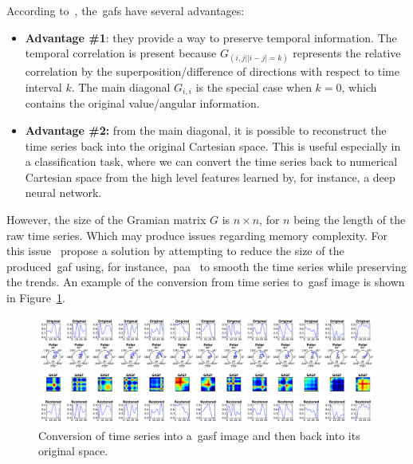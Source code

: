 According to~\cite{wang_imaging_2015}, the~\gls{gaf}s have several advantages:

\begin{itemize}[leftmargin=*,labelsep=5.8mm]
\item \textbf{{Advantage \#1}}: they provide a way to preserve temporal information. The temporal correlation is present because $G_{(i,j||i-j|=k)}$ represents the relative correlation by the superposition/difference of directions with respect to time interval $k$. The main diagonal $G_{i,i}$ is the special case when $k = 0$, which contains the original value/angular information. 
\item \textbf{{Advantage \#2:}} from the main diagonal, it is possible to reconstruct the time series back into the original Cartesian space. This is useful especially in a classification task, where we can convert the time series back to numerical Cartesian space from the high level features learned by, for instance, a deep neural network.
\end{itemize}

However, the size of the Gramian matrix $G$ is $n \times n$, for $n$ being the length of the raw time series. Which may produce issues regarding memory complexity. For this issue~\cite{wang_imaging_2015} propose a solution by attempting to reduce the size of the produced~\gls{gaf} using, for instance,~\gls{paa}~\citep{keogh_scaling_2000} to smooth the time series while preserving the trends. An example of the conversion from time series to~\gls{gasf} image is shown in Figure~\ref{figure:gasf_example}.

\begin{figure} [h]
\centering
\includegraphics[width=\textwidth]{images/05-modeling/gasfpipeline} 
 \caption{Conversion of time series into a~\gls{gasf} image and then back into its original space.}
 \label{figure:gasf_example}
\end{figure}

